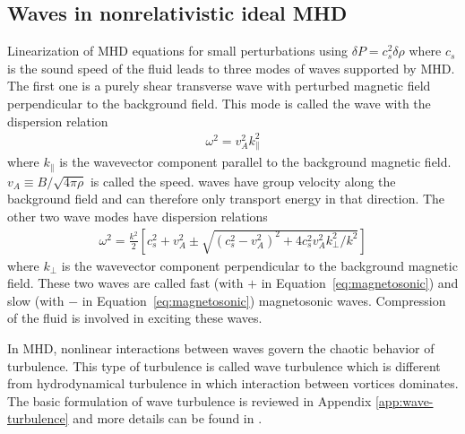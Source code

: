 \subsection{Waves in nonrelativistic ideal MHD}
Linearization of MHD equations for small perturbations using $\delta P = c_s^2\delta \rho$ where $c_s$ is the sound speed of the fluid leads to three modes of waves supported by MHD.
The first one is a purely shear transverse wave with perturbed magnetic field perpendicular to the background field.
This mode is called the \alfven wave with the dispersion relation 
\begin{eqnarray}
	\omega^2 = v_A^2 k_{\parallel}^2
\end{eqnarray}
where $k_{\parallel}$ is the wavevector component parallel to the background magnetic field.
$v_A\equiv B/\sqrt{4\pi\rho}$ is called the \alfven speed.
\alfven waves have group velocity along the background field and can therefore only transport energy in that direction.
The other two wave modes have dispersion relations
\begin{eqnarray}\label{eq:magnetosonic}
	\omega^2 = \frac{k^2}{2}\left[ c_s^2 + v_A^2 \pm\sqrt{(c_s^2-v_A^2)^2+4 c_s^2 v_A^2k_\perp^2/k^2}  \right]
\end{eqnarray}
where $k_\perp$ is the wavevector component perpendicular to the background magnetic field.
These two waves are called fast (with $+$ in Equation~\ref{eq:magnetosonic}) and slow (with $-$ in Equation~\ref{eq:magnetosonic}) magnetosonic waves. Compression of the fluid is involved in exciting these waves.

In MHD, nonlinear interactions between waves govern the chaotic behavior of turbulence.
This type of turbulence is called wave turbulence which is different from hydrodynamical turbulence in which interaction between vortices dominates.
The basic formulation of wave turbulence is reviewed in Appendix \ref{app:wave-turbulence} and more details can be found in \citet{2011LNP...825.....N}.

